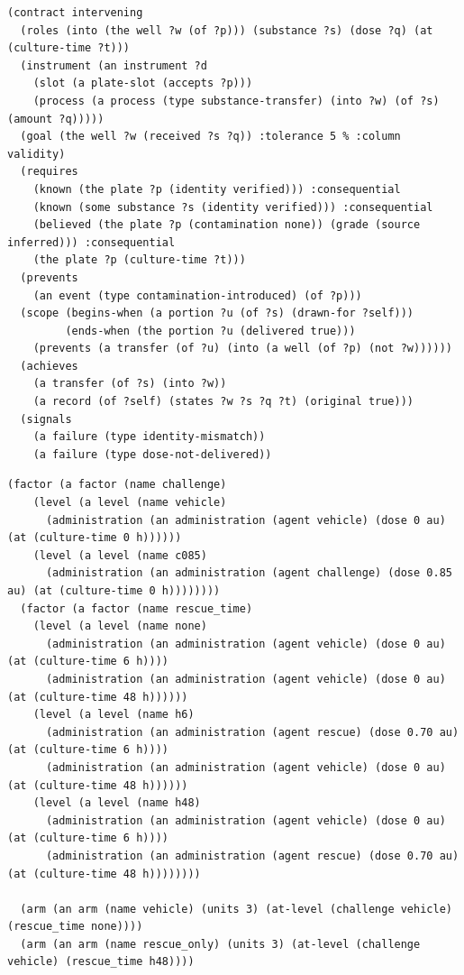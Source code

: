 \documentclass[10.5pt,a4paper]{article}
\begin{document}
\par\vspace{2pt}\begin{Verbatim}[fontsize=\scriptsize,frame=lines,framesep=2mm,breaklines]
(contract intervening
  (roles (into (the well ?w (of ?p))) (substance ?s) (dose ?q) (at (culture-time ?t)))
  (instrument (an instrument ?d
    (slot (a plate-slot (accepts ?p)))
    (process (a process (type substance-transfer) (into ?w) (of ?s) (amount ?q)))))
  (goal (the well ?w (received ?s ?q)) :tolerance 5 % :column validity)
  (requires
    (known (the plate ?p (identity verified))) :consequential
    (known (some substance ?s (identity verified))) :consequential
    (believed (the plate ?p (contamination none)) (grade (source inferred))) :consequential
    (the plate ?p (culture-time ?t)))
  (prevents
    (an event (type contamination-introduced) (of ?p)))
  (scope (begins-when (a portion ?u (of ?s) (drawn-for ?self)))
         (ends-when (the portion ?u (delivered true)))
    (prevents (a transfer (of ?u) (into (a well (of ?p) (not ?w))))))
  (achieves
    (a transfer (of ?s) (into ?w))
    (a record (of ?self) (states ?w ?s ?q ?t) (original true)))
  (signals
    (a failure (type identity-mismatch))
    (a failure (type dose-not-delivered))
\end{Verbatim}

\par\vspace{2pt}\begin{Verbatim}[fontsize=\scriptsize,frame=lines,framesep=2mm,breaklines]
  (factor (a factor (name challenge)
    (level (a level (name vehicle)
      (administration (an administration (agent vehicle) (dose 0 au) (at (culture-time 0 h))))))
    (level (a level (name c085)
      (administration (an administration (agent challenge) (dose 0.85 au) (at (culture-time 0 h))))))))
  (factor (a factor (name rescue_time)
    (level (a level (name none)
      (administration (an administration (agent vehicle) (dose 0 au) (at (culture-time 6 h))))
      (administration (an administration (agent vehicle) (dose 0 au) (at (culture-time 48 h))))))
    (level (a level (name h6)
      (administration (an administration (agent rescue) (dose 0.70 au) (at (culture-time 6 h))))
      (administration (an administration (agent vehicle) (dose 0 au) (at (culture-time 48 h))))))
    (level (a level (name h48)
      (administration (an administration (agent vehicle) (dose 0 au) (at (culture-time 6 h))))
      (administration (an administration (agent rescue) (dose 0.70 au) (at (culture-time 48 h))))))))

  (arm (an arm (name vehicle) (units 3) (at-level (challenge vehicle) (rescue_time none))))
  (arm (an arm (name rescue_only) (units 3) (at-level (challenge vehicle) (rescue_time h48))))
\end{Verbatim}
\end{document}
